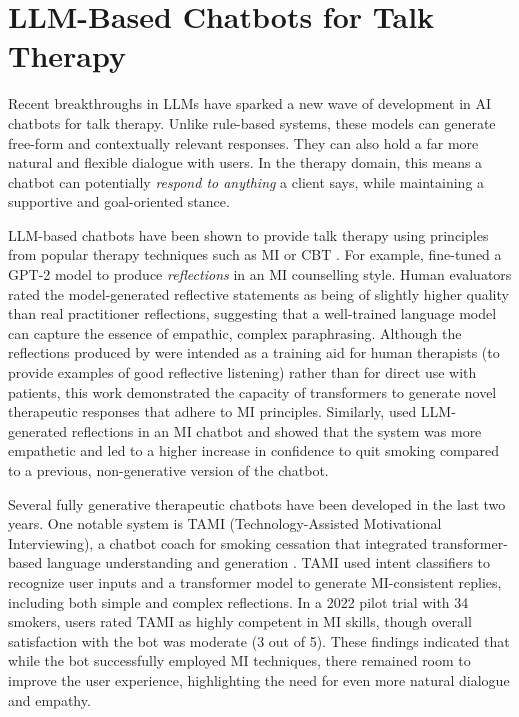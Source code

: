 \section{LLM-Based Chatbots for Talk Therapy}
Recent breakthroughs in LLMs have sparked a new wave of development in AI chatbots for talk therapy. Unlike rule-based systems, these models can generate free-form and contextually relevant responses. They can also hold a far more natural and flexible dialogue with users. In the therapy domain, this means a chatbot can potentially \textit{respond to anything} a client says, while maintaining a supportive and goal-oriented stance. 

LLM-based chatbots have been shown to provide talk therapy using principles from popular therapy techniques such as MI or CBT \cite{mahmood-etal-2025-fully,kian2024can,Ye2025}. For example, \citet{shen-etal-2020-counseling} fine-tuned a GPT-2 model to produce \emph{reflections} in an MI counselling style. Human evaluators rated the model-generated reflective statements as being of slightly higher quality than real practitioner reflections, suggesting that a well-trained language model can capture the essence of empathic, complex paraphrasing. Although the reflections produced by \citet{shen-etal-2020-counseling} were intended as a training aid for human therapists (to provide examples of good reflective listening) rather than for direct use with patients, this work demonstrated the capacity of transformers to generate novel therapeutic responses that adhere to MI principles. Similarly, \citet{brown2023mi} used LLM-generated reflections in an MI chatbot and showed that the system was more empathetic and led to a higher increase in confidence to quit smoking compared to a previous, non-generative version of the chatbot.


Several fully generative therapeutic chatbots have been developed in the last two years. One notable system is TAMI (Technology-Assisted Motivational Interviewing), a chatbot coach for smoking cessation that integrated transformer-based language understanding and generation \cite{SAIYED2022121}. TAMI used intent classifiers to recognize user inputs and a transformer model to generate MI-consistent replies, including both simple and complex reflections. In a 2022 pilot trial with 34 smokers, users rated TAMI as highly competent in MI skills, though overall satisfaction with the bot was moderate (3 out of 5). These findings indicated that while the bot successfully employed MI techniques, there remained room to improve the user experience, highlighting the need for even more natural dialogue and empathy.

